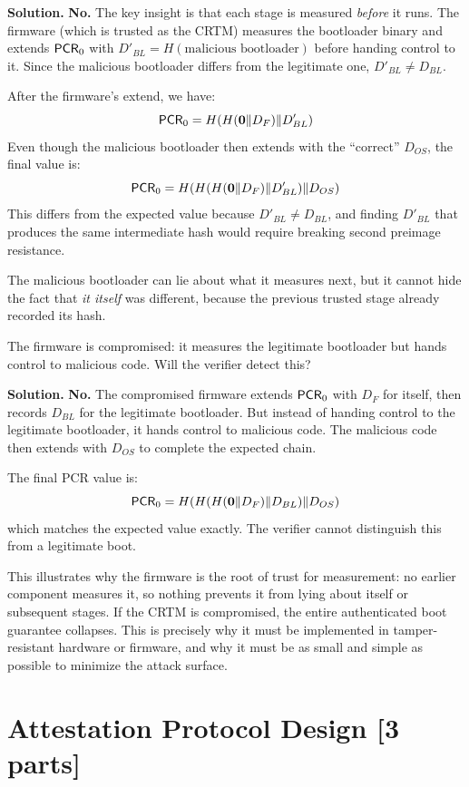 \documentclass[11pt]{article}
\newcommand{\pcr}[1]{\ms{PCR}_{#1}}
\begin{document}
\noindent\textbf{Solution.}
\textbf{No.}  The key insight is that each stage is measured
\emph{before} it runs.  The firmware (which is trusted as the CRTM)
measures the bootloader binary and extends $\pcr{0}$ with
$D'_{BL} = H(\text{malicious bootloader})$ before handing control to it.
Since the malicious bootloader differs from the legitimate one,
$D'_{BL} \neq D_{BL}$.

After the firmware's extend, we have:
\[
  \pcr{0} = H(H(\mathbf{0} \| D_F) \| D'_{BL})
\]
Even though the malicious bootloader then extends with the ``correct''
$D_{OS}$, the final value is:
\[
  \pcr{0} = H(H(H(\mathbf{0} \| D_F) \| D'_{BL}) \| D_{OS})
\]
This differs from the expected value because $D'_{BL} \neq D_{BL}$,
and finding $D'_{BL}$ that produces the same intermediate hash would
require breaking second preimage resistance.

The malicious bootloader can lie about what it measures next, but it
cannot hide the fact that \emph{it itself} was different, because the
previous trusted stage already recorded its hash.

\begin{task}\rm
  The firmware is compromised: it measures the legitimate bootloader
  but hands control to malicious code.  Will the verifier detect this?
\end{task}

\noindent\textbf{Solution.}
\textbf{No.}  The compromised firmware extends $\pcr{0}$ with
$D_F$ for itself, then records $D_{BL}$ for the legitimate bootloader.
But instead of handing control to the legitimate bootloader, it hands
control to malicious code.  The malicious code then extends with
$D_{OS}$ to complete the expected chain.

The final PCR value is:
\[
  \pcr{0} = H(H(H(\mathbf{0} \| D_F) \| D_{BL}) \| D_{OS})
\]
which matches the expected value exactly.  The verifier cannot
distinguish this from a legitimate boot.

This illustrates why the firmware is the root of trust for measurement:
no earlier component measures it, so nothing prevents it from lying
about itself or subsequent stages.  If the CRTM is compromised, the
entire authenticated boot guarantee collapses.  This is precisely why
it must be implemented in tamper-resistant hardware or firmware, and why
it must be as small and simple as possible to minimize the attack
surface.

\clearpage

\section*{Attestation Protocol Design [3 parts]}
\end{document}
